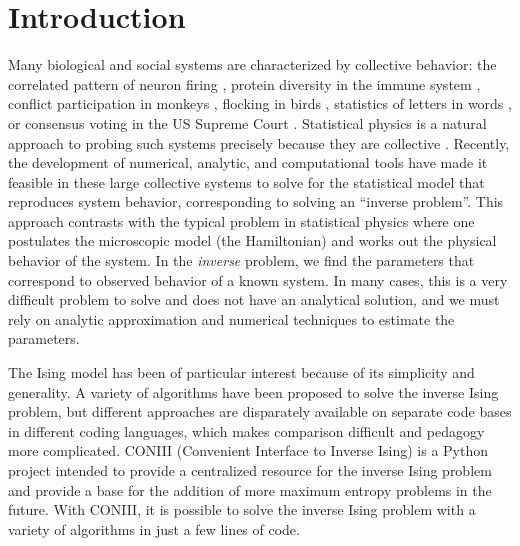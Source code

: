 \documentclass[aps,prl,twocolumn,nofootinbib]{revtex4-1}
\begin{document}
\section{Introduction}
Many biological and social systems are characterized by collective behavior: the correlated pattern of neuron firing \cite{Schneidman:2006he}, protein diversity in the immune system \cite{XXX}, conflict participation in monkeys \cite{XXX}, flocking in birds \cite{Bialek:2012cs}, statistics of letters in words \cite{XXX}, or consensus voting in the US Supreme Court \cite{Lee:2015ev}. Statistical physics is a natural approach to probing such systems precisely because they are collective \cite{Castellano:2009ce}.
Recently, the development of numerical, analytic, and computational tools have made it feasible in these large collective systems to solve for the statistical model that reproduces system behavior, corresponding to solving an ``inverse problem''.
This approach contrasts with the typical problem in statistical physics where one postulates the microscopic model (the Hamiltonian) and works out the physical behavior of the system. In the \textit{inverse} problem, we  find the parameters that correspond to observed behavior of a known system. In many cases, this is a very difficult problem to solve and does not have an analytical solution, and we must rely on analytic approximation and numerical techniques to estimate the parameters.

The Ising model has been of particular interest because of its simplicity and generality. A variety of algorithms have been proposed to solve the inverse Ising problem, but different approaches are disparately available on separate code bases in different coding languages, which makes comparison difficult and pedagogy more complicated.
CONIII (Convenient Interface to Inverse Ising) is a Python project intended to provide a centralized resource for the inverse Ising problem and provide a base for the addition of more maximum entropy problems in the future. With CONIII, it is possible to solve the inverse Ising problem with a variety of algorithms in just a few lines of code.
\end{document}
